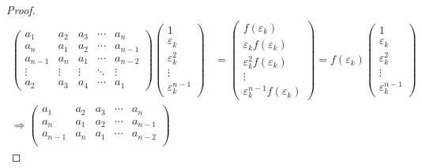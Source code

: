 \documentclass[class=nhvh-linear-algebra,crop=false]{standalone}
\begin{document}
\begin{proof}
    \begingroup{}
    \allowdisplaybreaks{}
    \begin{align*}
        \begin{pmatrix}
            a_{1}   & a_{2}  & a_{3}  & \cdots & a_{n}   \\
            a_{n}   & a_{1}  & a_{2}  & \cdots & a_{n-1} \\
            a_{n-1} & a_{n}  & a_{1}  & \cdots & a_{n-2} \\
            \vdots  & \vdots & \vdots & \ddots & \vdots  \\
            a_{2}   & a_{3}  & a_{4}  & \cdots & a_{1}
        \end{pmatrix}
        \begin{pmatrix}
            1                   \\
            \varepsilon_{k}     \\
            \varepsilon_{k}^{2} \\
            \vdots              \\
            \varepsilon_{k}^{n-1}
        \end{pmatrix}
         & =
        \begin{pmatrix}
            f(\varepsilon_{k})                    \\
            \varepsilon_{k}f(\varepsilon_{k})     \\
            \varepsilon_{k}^{2}f(\varepsilon_{k}) \\
            \vdots                                \\
            \varepsilon_{k}^{n-1}f(\varepsilon_{k})
        \end{pmatrix}
        = f(\varepsilon_{k})
        \begin{pmatrix}
            1                   \\
            \varepsilon_{k}     \\
            \varepsilon_{k}^{2} \\
            \vdots              \\
            \varepsilon_{k}^{n-1}
        \end{pmatrix}                   \\
        \Rightarrow
        \begin{pmatrix}
            a_{1}   & a_{2}  & a_{3}  & \cdots & a_{n}   \\
            a_{n}   & a_{1}  & a_{2}  & \cdots & a_{n-1} \\
            a_{n-1} & a_{n}  & a_{1}  & \cdots & a_{n-2} \\

\end{pmatrix}
\end{align*}
\end{proof}
\end{document}
